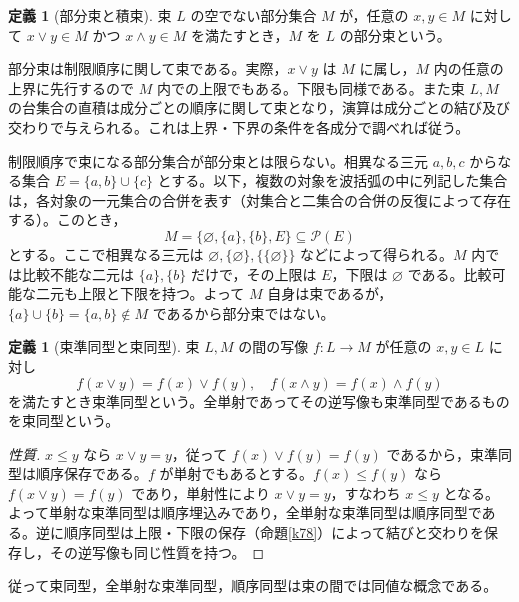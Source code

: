 \documentclass[a5paper,10pt,dvipdfmx]{jsarticle}
\theoremstyle{definition}
\newtheorem{defn}[ruledef]{定義}
\theoremstyle{plain}
\newcommand{\Pow}{\mathcal{P}}
\begin{document}
\begin{defn}[部分束と積束]\label{k83}
束 $L$ の空でない部分集合 $M$ が，任意の $x,y\in M$ に対して $x\vee y\in M$ かつ $x\wedge y\in M$ を満たすとき，$M$ を $L$ の部分束という。
\end{defn}
部分束は制限順序に関して束である。実際，$x\vee y$ は $M$ に属し，$M$ 内の任意の上界に先行するので $M$ 内での上限でもある。下限も同様である。また束 $L,M$ の台集合の直積は成分ごとの順序に関して束となり，演算は成分ごとの結び及び交わりで与えられる。これは上界・下界の条件を各成分で調べれば従う。

制限順序で束になる部分集合が部分束とは限らない。相異なる三元 $a,b,c$ からなる集合 $E=\{a,b\}\cup\{c\}$ とする。以下，複数の対象を波括弧の中に列記した集合は，各対象の一元集合の合併を表す（対集合と二集合の合併の反復によって存在する）。このとき，
\[
 M=\{\varnothing,\{a\},\{b\},E\}\subseteq\Pow(E)
\]
とする。ここで相異なる三元は $\varnothing,\{\varnothing\},\{\{\varnothing\}\}$ などによって得られる。$M$ 内では比較不能な二元は $\{a\},\{b\}$ だけで，その上限は $E$，下限は $\varnothing$ である。比較可能な二元も上限と下限を持つ。よって $M$ 自身は束であるが，$\{a\}\cup\{b\}=\{a,b\}\notin M$ であるから部分束ではない。
\begin{defn}[束準同型と束同型]\label{k84}
束 $L,M$ の間の写像 $f:L\to M$ が任意の $x,y\in L$ に対し
\[
 f(x\vee y)=f(x)\vee f(y),\quad
 f(x\wedge y)=f(x)\wedge f(y)
\]
を満たすとき束準同型という。全単射であってその逆写像も束準同型であるものを束同型という。
\end{defn}
\begin{proof}[性質]
$x\leq y$ なら $x\vee y=y$，従って $f(x)\vee f(y)=f(y)$ であるから，束準同型は順序保存である。$f$ が単射でもあるとする。$f(x)\leq f(y)$ なら $f(x\vee y)=f(y)$ であり，単射性により $x\vee y=y$，すなわち $x\leq y$ となる。よって単射な束準同型は順序埋込みであり，全単射な束準同型は順序同型である。逆に順序同型は上限・下限の保存（命題\ref{k78}）によって結びと交わりを保存し，その逆写像も同じ性質を持つ。
\end{proof}
従って束同型，全単射な束準同型，順序同型は束の間では同値な概念である。
\end{document}
